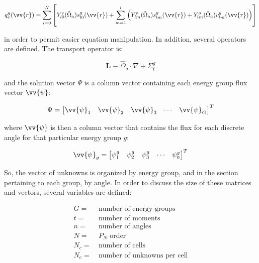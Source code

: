 \documentclass[10pt]{article}
\begin{document}
\begin{flushleft}
\begin{equation}
q_e^g(\vv{r})=\sum_{l=0}^{N}\left\lbrack Y_{l0}^e(\hat{\Omega}_a)s_{l0}^g(\vv{r})+\sum_{m=1}^{l}\left(Y_{lm}^e(\hat{\Omega}_a)s_{lm}^g(\vv{r})+Y_{lm}^o(\hat{\Omega}_a)v_{lm}^g(\vv{r})\right)\right\rbrack
\end{equation}

in order to permit easier equation manipulation. In addition, several operators are defined. The transport operator is:

\begin{equation}
\textbf{L}\equiv\hat{\Omega}_a\cdot\nabla+\Sigma_t^g
\end{equation}

and the solution vector \(\Psi\) is a column vector containing each energy group flux vector \(\vv{\psi}\):

\begin{equation}
\Psi=\begin{bmatrix}\vv{\psi}_1&\vv{\psi}_2&\vv{\psi}_3&\cdots&\vv{\psi}_G\end{bmatrix}^T
\end{equation}

where \(\vv{\psi}\) is then a column vector that contains the flux for each discrete angle for that particular energy group \(g\):

\begin{equation}
\vv{\psi}_g=\begin{bmatrix}\psi_1^g&\psi_2^g&\psi_3^g&\cdots&\psi_n^g\end{bmatrix}^T
\end{equation}

So, the vector of unknowns is organized by energy group, and in the section pertaining to each group, by angle. In order to discuss the size of these matrices and vectors, several variables are defined:

\begin{equation}
\begin{aligned}
G=&\ \text{number of energy groups}\\
t = &\ \text{number of moments}\\
n = &\ \text{number of angles}\\
N = &\ P_N\text{\ order}\\
N_c=&\ \text{number of cells}\\
N_e=&\ \text{number of unknowns per cell}\\
\end{aligned}
\end{equation} 


\end{flushleft}
\end{document}
